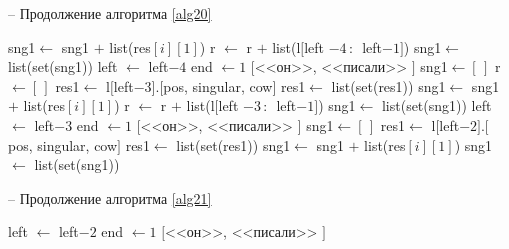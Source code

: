 \documentclass[main]{subfiles}
\begin{document}
\begin{algorithm}
	\caption{-- Продолжение алгоритма \ref{alg20}}\label{alg21}
	\begin{algorithmic}[1]
		\State sng1$\gets$ sng1 $+$ list(res$[i][1]$)
		\State r $\gets$ r $+$ list(l$[$left $-4\, :\, $ left$-1 ]$)
		\EndIf
		\EndFor	
		\State sng1$\gets$ list(set(sng1))
		\State left $\gets$ left$-4$
		\State end $\gets 1$
		\State \Return $[$<<он>>, <<писали>> $]$
		\EndIf
		\EndIf
		\State sng1$\gets [\,]$
		\State r $\gets [\, ]$
		\State res1$\gets$ l$[$left$-3]$.$[$pos, singular, cow$]$
		\State res1$\gets$ list(set(res1))
		\State sng1$\gets$ sng1 $+$ list(res$[i][1]$)
		\State r $\gets$ r $+$ list(l$[$left $-3\, :\, $ left$-1 ]$)
		\EndIf
		\EndFor	
		\State sng1$\gets$ list(set(sng1))
		\State left $\gets$ left$-3$
		\State end $\gets 1$
		\State \Return $[$<<он>>, <<писали>> $]$
		\EndIf
		\EndIf
		\State sng1$\gets [\,]$
		\State res1$\gets$ l$[$left$-2]$.$[$pos, singular, cow$]$
		\State res1$\gets$ list(set(res1))
		\State sng1$\gets$ sng1 $+$ list(res$[i][1]$)
		\EndIf
		\EndFor	
		\State sng1$\gets$ list(set(sng1))
	\end{algorithmic}
\end{algorithm}
\pagebreak
\begin{algorithm}
	\caption{-- Продолжение алгоритма \ref{alg21}}\label{alg22}
	\begin{algorithmic}[1]
				\State left $\gets$ left$-2$
		\State end $\gets 1$
		\State \Return $[$<<он>>, <<писали>> $]$
		\EndIf
		\EndIf
		\EndIf
		\EndWhile
	\end{algorithmic}
\end{algorithm}
\end{document}
